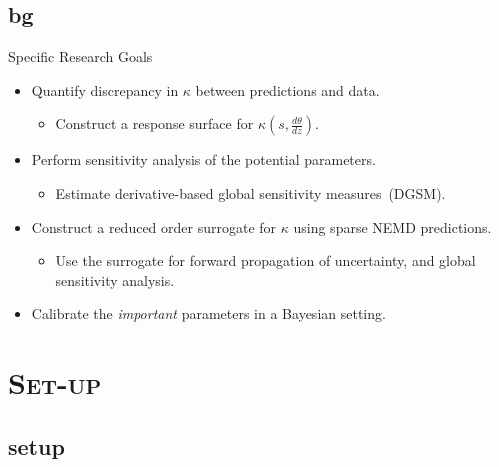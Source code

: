 \documentclass[xcolor={x11names,table},compress,svgnames,mathserif]{beamer}
\renewcommand{\(}{\begin{columns}}
\renewcommand{\)}{\end{columns}}
\newcommand{\<}[1]{\begin{column}{#1}}
\renewcommand{\>}{\end{column}}
\newcommand*\myitem{%
  \item[\color{DeepSkyBlue4}\scalebox{0.6}{\ding{110}}]}
\begin{document}

\subsection{bg}

\begin{frame}{Specific Research Goals}

\begin{itemize}

\myitem Quantify discrepancy in $\kappa$ between predictions and data.
\begin{itemize}
\item Construct a response surface for $\kappa(s,\frac{d\theta}{dz})$.
\end{itemize}
\pause
\vspace{2mm}
\myitem Perform sensitivity analysis of the potential parameters.
\begin{itemize}
\item Estimate derivative-based global sensitivity measures~(DGSM).
\end{itemize}
\pause
\vspace{2mm}
\myitem Construct a reduced order surrogate for $\kappa$ using sparse
NEMD predictions.
\begin{itemize}
\item Use the surrogate for forward propagation of uncertainty, and global
sensitivity analysis. 
\end{itemize}
\pause
\vspace{2mm}
\myitem Calibrate the \textit{important} parameters in a Bayesian setting.

\end{itemize}

\end{frame}


\section{\scshape Set-up}
\subsection{setup}
\end{document}
